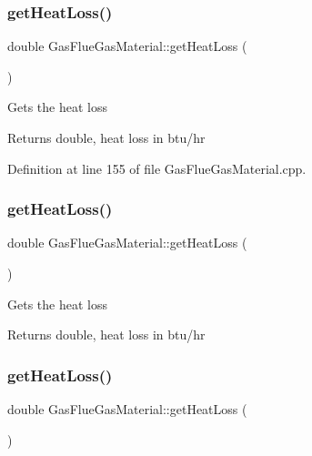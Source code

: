 \subsubsection{\texorpdfstring{get\+Heat\+Loss()}{getHeatLoss()}\hspace{0.1cm}{\footnotesize\ttfamily [1/3]}}
{\footnotesize\ttfamily double Gas\+Flue\+Gas\+Material\+::get\+Heat\+Loss (\begin{DoxyParamCaption}{ }\end{DoxyParamCaption})}

Gets the heat loss

\begin{DoxyReturn}{Returns}
double, heat loss in btu/hr 
\end{DoxyReturn}


Definition at line 155 of file Gas\+Flue\+Gas\+Material.\+cpp.

\mbox{\label{class_gas_flue_gas_material_ad9990d400536c6e8c7c53b9212de400b}} 
\subsubsection{\texorpdfstring{get\+Heat\+Loss()}{getHeatLoss()}\hspace{0.1cm}{\footnotesize\ttfamily [2/3]}}
{\footnotesize\ttfamily double Gas\+Flue\+Gas\+Material\+::get\+Heat\+Loss (\begin{DoxyParamCaption}{ }\end{DoxyParamCaption})}

Gets the heat loss

\begin{DoxyReturn}{Returns}
double, heat loss in btu/hr 
\end{DoxyReturn}
\mbox{\label{class_gas_flue_gas_material_ad9990d400536c6e8c7c53b9212de400b}} 
\subsubsection{\texorpdfstring{get\+Heat\+Loss()}{getHeatLoss()}\hspace{0.1cm}{\footnotesize\ttfamily [3/3]}}
{\footnotesize\ttfamily double Gas\+Flue\+Gas\+Material\+::get\+Heat\+Loss (\begin{DoxyParamCaption}{ }\end{DoxyParamCaption})}

